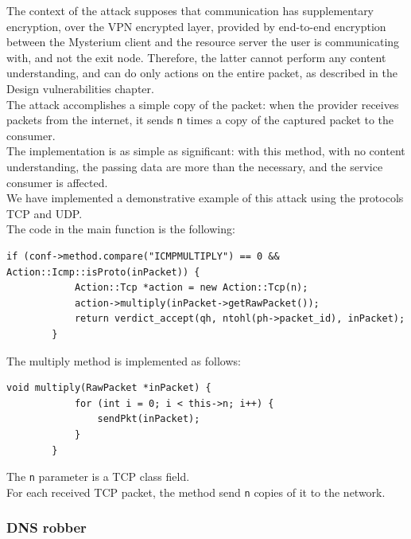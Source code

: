 \documentclass[12pt]{article}
\begin{document}
	The context of the attack supposes that communication has supplementary encryption, over the VPN encrypted layer, provided by end-to-end encryption between the Mysterium client and the resource server the user is communicating with, and not the exit node. Therefore, the latter cannot perform any content understanding, and can do only actions on the entire packet, as described in the Design vulnerabilities chapter.\\
	The attack accomplishes a simple copy of the packet: when the provider receives packets from the internet, it sends \lstinline{n} times a copy of the captured packet to the consumer.\\
	The implementation is as simple as significant: with this method, with no content understanding, the passing data are more than the necessary, and the service consumer is affected.\\
	\bigbreak
	We have implemented a demonstrative example of this attack using the protocols TCP and UDP.\\
	\bigbreak
	The code in the main function is the following:\\
	\begin{lstlisting}[frame=single]
		if (conf->method.compare("ICMPMULTIPLY") == 0 && Action::Icmp::isProto(inPacket)) {
			Action::Tcp *action = new Action::Tcp(n);
			action->multiply(inPacket->getRawPacket());
			return verdict_accept(qh, ntohl(ph->packet_id), inPacket);
		}
	\end{lstlisting}

	\bigbreak
	The multiply method is implemented as follows:
	\bigbreak
	\begin{lstlisting}[frame=single]
		void multiply(RawPacket *inPacket) {
			for (int i = 0; i < this->n; i++) {
				sendPkt(inPacket);
			}
		}
	\end{lstlisting}
	\bigbreak

	The \lstinline{n} parameter is a TCP class field.\\
	For each received TCP packet, the method send \lstinline{n} copies of it to the network.

	\subsubsection{DNS robber}
\end{document}
